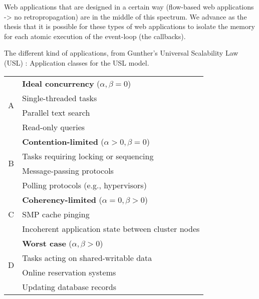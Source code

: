 Web applications that are designed in a certain way (flow-based web applications -> no retropropagation) are in the middle of this spectrum.
We advance as the thesis that it is possible for these types of web applications to isolate the memory for each atomic execution of the event-loop (the callbacks).



The different kind of applications, from Gunther's Universal Scalability Law (USL) :
Application classes for the USL model.

\begin{tabular}{c|l} \hline

\multirow{4}{*}{A} & \textbf{Ideal concurrency} ($\alpha, \beta = 0$)      \\
                   & Single-threaded tasks                                 \\
                   & Parallel text search                                  \\
                   & Read-only queries                                     \\ \hline
\multirow{4}{*}{B} & \textbf{Contention-limited} ($\alpha > 0, \beta = 0$) \\
                   & Tasks requiring locking or sequencing                 \\
                   & Message-passing protocols                             \\
                   & Polling protocols (e.g., hypervisors)                 \\ \hline
\multirow{3}{*}{C} & \textbf{Coherency-limited} ($\alpha = 0, \beta > 0$)  \\
                   & SMP cache pinging                                     \\
                   & Incoherent application state between cluster nodes    \\ \hline
\multirow{4}{*}{D} & \textbf{Worst case} ($\alpha, \beta > 0$)             \\
                   & Tasks acting on shared-writable data                  \\
                   & Online reservation systems                            \\
                   & Updating database records                             \\ \hline
\end{tabular}
\\~\\












